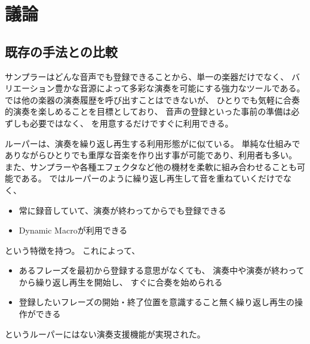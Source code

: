 \section{議論}


\subsection{既存の手法との比較}
サンプラーはどんな音声でも登録できることから、単一の楽器だけでなく、
バリエーション豊かな音源によって多彩な演奏を可能にする強力なツールである。
{\system}では他の楽器の演奏履歴を呼び出すことはできないが、
ひとりでも気軽に合奏的演奏を楽しめることを目標としており、
音声の登録といった事前の準備は必ずしも必要ではなく、
{\system}を用意するだけですぐに利用できる。

ルーパーは、演奏を繰り返し再生する利用形態が{\system}に似ている。
単純な仕組みでありながらひとりでも重厚な音楽を作り出す事が可能であり、利用者も多い。
また、サンプラーや各種エフェクタなど他の機材を柔軟に組み合わせることも可能である。
{\system}ではルーパーのように繰り返し再生して音を重ねていくだけでなく、
\begin{itemize}
\item 常に録音していて、演奏が終わってからでも登録できる
\item Dynamic Macroが利用できる
\end{itemize}
という特徴を持つ。
これによって、
\begin{itemize}
\item あるフレーズを最初から登録する意思がなくても、
  演奏中や演奏が終わってから繰り返し再生を開始し、
  すぐに合奏を始められる
\item 登録したいフレーズの開始・終了位置を意識すること無く繰り返し再生の操作ができる
\end{itemize}
というルーパーにはない演奏支援機能が実現された。





